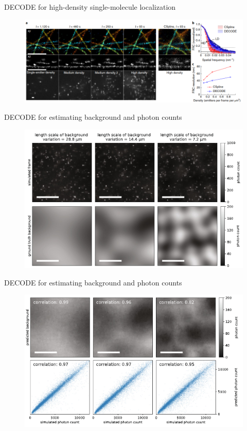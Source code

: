 \documentclass{beamer}			%
\begin{document}
\begin{frame}{DECODE for high-density single-molecule localization}
\begin{figure}
\includegraphics[width=13cm]{decode/Figure-4.png}
\end{figure}
\end{frame}

\begin{frame}{DECODE for estimating background and photon counts}
\begin{figure}
\includegraphics[width=13cm]{decode/Figure-5-1.png}
\end{figure}
\end{frame}


\begin{frame}{DECODE for estimating background and photon counts}
\begin{figure}
\includegraphics[width=13cm]{decode/Figure-5-2.png}
\end{figure}
\end{frame}
\end{document}
